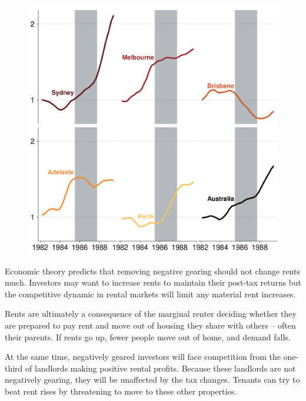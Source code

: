 \documentclass{grattan}\usepackage[]{graphicx}\usepackage[]{color}
\begin{document}
\begin{figure}
\includegraphics[width=\columnwidth]{figure/Capital_city_rents-1}
\end{figure}
Economic theory predicts that removing negative gearing should not change rents much. Investors may want to increase rents to maintain their post-tax returns but the competitive dynamic in rental markets will limit any material rent increases. 

Rents are ultimately a consequence of the marginal renter deciding whether they are prepared to pay rent and move out of housing they share with others -- often their parents. If rents go up, fewer people move out of home, and demand falls. 

At the same time, negatively geared investors will face competition from the one-third of landlords making positive rental profits. Because these landlords are not negatively gearing, they will be unaffected by the tax changes. Tenants can try to beat rent rises by threatening to move to these other properties.
\end{document}
